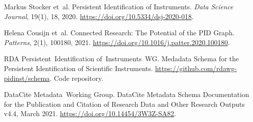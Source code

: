 \documentclass[titlepage=true,twoside=false,DIV=13]{scrartcl}
\begin{document}
%
%
\begin{thebibliography}{1}

Markus Stocker et~al.
\newblock Persistent Identification of Instruments.
\newblock \emph{Data Science Journal}, 19(1), 18, 2020.
\newblock \url{https://doi.org/10.5334/dsj-2020-018}.

Helena Cousijn et~al.
\newblock Connected Research: The Potential of the PID Graph.
\newblock \emph{Patterns}, 2(1), 100180, 2021.
\newblock \url{https://doi.org/10.1016/j.patter.2020.100180}.

RDA Persistent~Identification of~Instruments~WG.
\newblock Medadata Schema for the Persistent Identification of Scientific
  Instruments.
\newblock \url{https://github.com/rdawg-pidinst/schema}.
\newblock Code repository.

DataCite Metadata~Working Group.
\newblock DataCite Metadata Schema Documentation for the Publication and
  Citation of Research Data and Other Research Outputs v4.4, March 2021.
\newblock \url{https://doi.org/10.14454/3W3Z-SA82}.

\end{thebibliography}
\end{document}
